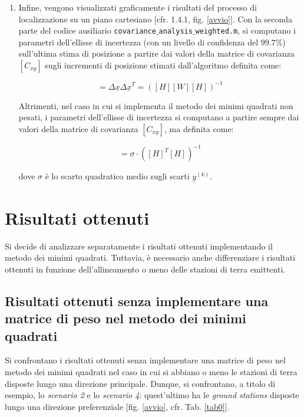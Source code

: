 \documentclass[a4paper,11pt,twoside]{book}
\begin{document}
\begin{enumerate}
	\item Infine, vengono visualizzati graficamente i risultati del processo di localizzazione su un piano cartesiano [cfr. 1.4.1, fig. \ref{avvio}]. Con la seconda parte del codice ausiliario \texttt{covariance$\_$analysis$\_$weighted.m}, si computano i parametri dell'ellisse di incertezza (con un livello di confidenza del $99.7\%$) sull'ultima stima di posizione a partire dai valori della matrice di covarianza $[C_{xy}]$ sugli incrementi di posizione stimati dall'algoritmo definita come:
	
	\begin{equation}
		[C_{xy}] = \Delta \underline{x} \Delta \underline{x}^T = ([H][W][H])^{-1}
	\end{equation}

	Altrimenti, nel caso in cui si implementa il metodo dei minimi quadrati non pesati, i parametri dell'ellisse di incertezza si computano a partire sempre dai valori della matrice di covarianza $[C_{xy}]$, ma definita come:
	
	\begin{equation}
		[C_{xy}] = \sigma \cdot ([H]^T[H])^{-1}
	\end{equation}
	
	dove $\sigma$ è lo scarto quadratico medio sugli scarti $\underline{y}^{(k)}$.
				
	\end{enumerate}
	

	\section{Risultati ottenuti}
	
	Si decide di analizzare separatamente i risultati ottenuti implementando il metodo dei minimi quadrati. Tuttavia, è necessario anche differenziare i risultati ottenuti in funzione dell'allineamento o meno delle stazioni di terra emittenti.
	
	\subsection{Risultati ottenuti senza implementare una matrice di peso nel metodo dei minimi quadrati}
	
	Si confrontano i risultati ottenuti senza implementare una matrice di peso nel metodo dei minimi quadrati nel caso in cui si abbiano o meno le stazioni  di terra disposte lungo una direzione principale. Dunque, si confrontano, a titolo di esempio, lo \textsl{scenario 2} e lo \textsl{scenario 4}: quest'ultimo ha le \textit{ground stations} disposte lungo una direzione preferenziale [fig. \ref{avvio}, cfr. Tab. \ref{tab0}].
	
\end{document}
